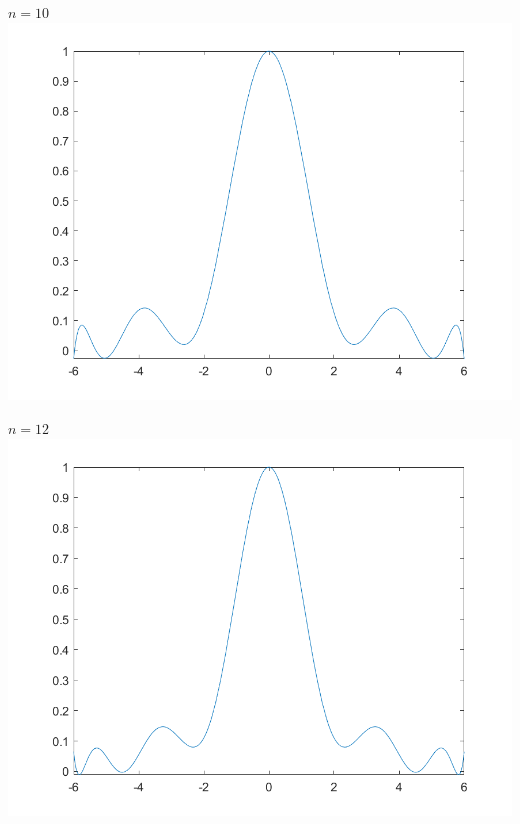 \begin{center}
	\(n=10\) \\
	\includegraphics[scale=0.55]{cap4/4_7/10.png}
\end{center}

\begin{center}
	\(n=12\) \\
	\includegraphics[scale=0.55]{cap4/4_7/12.png}
\end{center}

